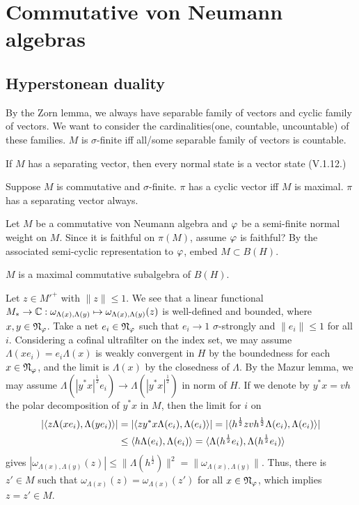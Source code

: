 \documentclass{../../large}
\begin{document}
\chapter{Commutative von Neumann algebras}


\section{Hyperstonean duality}



By the Zorn lemma, we always have separable family of vectors and cyclic family of vectors.
We want to consider the cardinalities(one, countable, uncountable) of these families.
$M$ is $\sigma$-finite iff all/some separable family of vectors is countable.


If $M$ has a separating vector, then every normal state is a vector state (V.1.12.)


Suppose $M$ is commutative and $\sigma$-finite.
$\pi$ has a cyclic vector iff $M$ is maximal.
$\pi$ has a separating vector always.


\begin{prb}
Let $M$ be a commutative von Neumann algebra and $\varphi$ be a semi-finite normal weight on $M$.
Since it is faithful on $\pi(M)$, assume $\varphi$ is faithful?
By the associated semi-cyclic representation to $\varphi$, embed $M\subset B(H)$.

\begin{parts}
\item $M$ is a maximal commutative subalgebra of $B(H)$.
\end{parts}
\end{prb}
\begin{pf}


Let $z\in M'^+$ with $\|z\|\le1$.
We see that a linear functional $M_*\to\mathbb{C}:\omega_{\Lambda(x),\Lambda(y)}\mapsto\omega_{\Lambda(x),\Lambda(y)}(z)$ is well-defined and bounded, where $x,y\in\mathfrak{N}_\varphi$.
Take a net $e_i\in\mathfrak{N}_\varphi$ such that $e_i\to1$ $\sigma$-strongly and $\|e_i\|\le1$ for all $i$.
Considering a cofinal ultrafilter on the index set, we may assume $\Lambda(xe_i)=e_i\Lambda(x)$ is weakly convergent in $H$ by the boundedness for each $x\in\mathfrak{N}_\varphi$, and the limit is $\Lambda(x)$ by the closedness of $\Lambda$.
By the Mazur lemma, we may assume $\Lambda(|y^*x|^{\frac12}e_i)\to\Lambda(|y^*x|^{\frac12})$ in norm of $H$.
If we denote by $y^*x=vh$ the polar decomposition of $y^*x$ in $M$, then the limit for $i$ on
\begin{align*}
|\langle z\Lambda(xe_i),\Lambda(ye_i)\rangle|
&=|\langle zy^*x\Lambda(e_i),\Lambda(e_i)\rangle|
=|\langle h^{\frac12}zvh^{\frac12}\Lambda(e_i),\Lambda(e_i)\rangle|\\
&\le\langle h\Lambda(e_i),\Lambda(e_i)\rangle
=\langle\Lambda(h^{\frac12}e_i),\Lambda(h^{\frac12}e_i)\rangle
\end{align*}
gives $|\omega_{\Lambda(x),\Lambda(y)}(z)|\le\|\Lambda(h^{\frac12})\|^2=\|\omega_{\Lambda(x),\Lambda(y)}\|$.
Thus, there is $z'\in M$ such that $\omega_{\Lambda(x)}(z)=\omega_{\Lambda(x)}(z')$ for all $x\in\mathfrak{N}_\varphi$, which implies $z=z'\in M$.


\end{pf}
\end{document}
